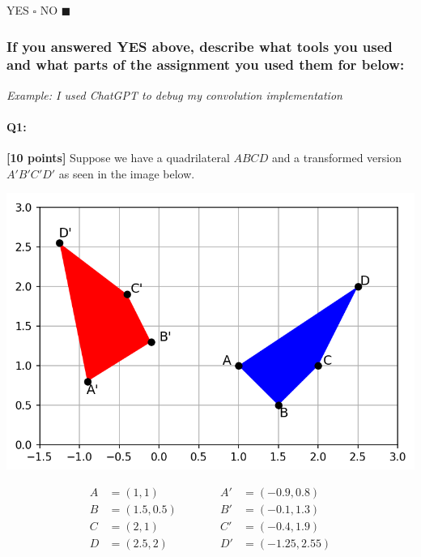 
YES $\square$ NO $\blacksquare$ %


\subsubsection*{If you answered YES above, describe what tools you used and what parts of the assignment you used them for below:}


\textit{Example: I used ChatGPT to debug my convolution implementation}

\pagebreak
\paragraph{Q1:} \textbf{[10 points]}
Suppose we have a quadrilateral $ABCD$ and a transformed version $A'B'C'D'$ as seen in the image below.

\includegraphics[width=\textwidth * 5/10]{images/quads_lstsq.png}

\begin{equation}
\begin{split}
A&=(1, 1)\\
B&=(1.5, 0.5)\\
C&=(2, 1)\\
D&=(2.5, 2)
\end{split}
\quad\quad\quad
\begin{split}
A'&=(-0.9, 0.8)\\
B'&=(-0.1, 1.3)\\
C'&=(-0.4, 1.9)\\
D'&=(-1.25, 2.55)
\end{split}
\end{equation}

